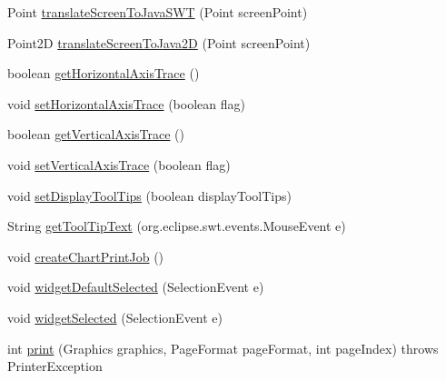 \begin{DoxyCompactItemize}
\item 
Point \mbox{\hyperlink{classorg_1_1jfree_1_1experimental_1_1chart_1_1swt_1_1_chart_composite_a339b02cba8916fb54fd754e7716fd034}{translate\+Screen\+To\+Java\+S\+WT}} (Point screen\+Point)
\item 
Point2D \mbox{\hyperlink{classorg_1_1jfree_1_1experimental_1_1chart_1_1swt_1_1_chart_composite_aa497a456c238a310ba48e4463a762330}{translate\+Screen\+To\+Java2D}} (Point screen\+Point)
\item 
boolean \mbox{\hyperlink{classorg_1_1jfree_1_1experimental_1_1chart_1_1swt_1_1_chart_composite_ac943d809344ff11a9c94c17d9a294b20}{get\+Horizontal\+Axis\+Trace}} ()
\item 
void \mbox{\hyperlink{classorg_1_1jfree_1_1experimental_1_1chart_1_1swt_1_1_chart_composite_a080a377ded69975b8816ee57241569b7}{set\+Horizontal\+Axis\+Trace}} (boolean flag)
\item 
boolean \mbox{\hyperlink{classorg_1_1jfree_1_1experimental_1_1chart_1_1swt_1_1_chart_composite_aefa1946bb5b8856aa7cb04808572d281}{get\+Vertical\+Axis\+Trace}} ()
\item 
void \mbox{\hyperlink{classorg_1_1jfree_1_1experimental_1_1chart_1_1swt_1_1_chart_composite_ac8982874af1c501c1c22e5f78a545a77}{set\+Vertical\+Axis\+Trace}} (boolean flag)
\item 
void \mbox{\hyperlink{classorg_1_1jfree_1_1experimental_1_1chart_1_1swt_1_1_chart_composite_a57635874734926fff19021abadb48c6c}{set\+Display\+Tool\+Tips}} (boolean display\+Tool\+Tips)
\item 
String \mbox{\hyperlink{classorg_1_1jfree_1_1experimental_1_1chart_1_1swt_1_1_chart_composite_a4e3868146eb41cccb9677889a1cc8846}{get\+Tool\+Tip\+Text}} (org.\+eclipse.\+swt.\+events.\+Mouse\+Event e)
\item 
void \mbox{\hyperlink{classorg_1_1jfree_1_1experimental_1_1chart_1_1swt_1_1_chart_composite_abeb2cdb655e1a23ac19c8d80f3a4667b}{create\+Chart\+Print\+Job}} ()
\item 
void \mbox{\hyperlink{classorg_1_1jfree_1_1experimental_1_1chart_1_1swt_1_1_chart_composite_a3fa2fbef41450634d721c4a0349bb828}{widget\+Default\+Selected}} (Selection\+Event e)
\item 
void \mbox{\hyperlink{classorg_1_1jfree_1_1experimental_1_1chart_1_1swt_1_1_chart_composite_ad31323f5cdb637a96cd9e53e72cfc451}{widget\+Selected}} (Selection\+Event e)
\item 
int \mbox{\hyperlink{classorg_1_1jfree_1_1experimental_1_1chart_1_1swt_1_1_chart_composite_a059b7aaa0b6cd3b9270e50e51966ec94}{print}} (Graphics graphics, Page\+Format page\+Format, int page\+Index)  throws Printer\+Exception 

\end{DoxyCompactItemize}
